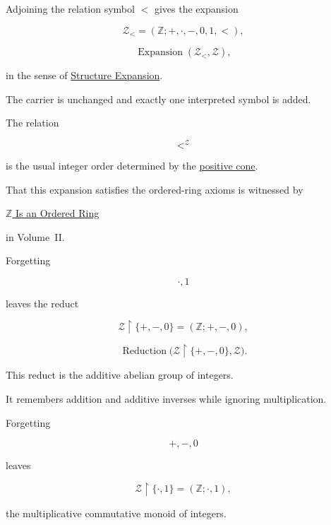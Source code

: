 \begin{remark*}

Adjoining the relation symbol $<$ gives the expansion

\[
\mathcal Z_{<}
=
(\mathbb Z;
+,
\cdot,
-,
0,
1,
<),
\]

\[
\operatorname{Expansion}
(\mathcal Z_{<},\mathcal Z),
\]

in the sense of
\hyperref[def:structure-expansion]{Structure Expansion}.

The carrier is unchanged and exactly one interpreted symbol is added.

The relation

\[
<^{\mathcal Z}
\]

is the usual integer order determined by the
\hyperref[def:positive-cone]{positive cone}.

That this expansion satisfies the ordered-ring axioms is witnessed by

\hyperref[thm:z-is-ordered-ring]{$\mathbb Z$ Is an Ordered Ring}

in Volume~II.

\end{remark*}


\begin{remark*}

Forgetting

\[
\cdot,
1
\]

leaves the reduct

\[
\mathcal Z
\!\restriction\!
\{+,-,0\}
=
(\mathbb Z;+,-,0),
\]

\[
\operatorname{Reduction}
\!\bigl(
\mathcal Z
\!\restriction\!
\{+,-,0\},
\mathcal Z
\bigr).
\]

This reduct is the additive abelian group of integers.

It remembers addition and additive inverses while ignoring multiplication.

\end{remark*}


\begin{remark*}

Forgetting

\[
+,
-,
0
\]

leaves

\[
\mathcal Z
\!\restriction\!
\{\cdot,1\}
=
(\mathbb Z;\cdot,1),
\]

the multiplicative commutative monoid of integers.

\end{remark*}

